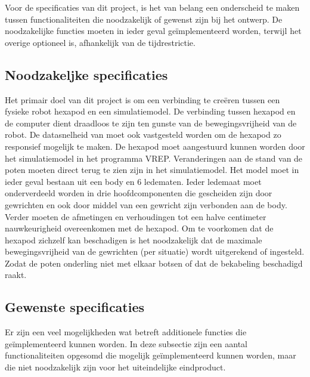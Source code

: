 \documentclass[10pt,a4paper]{article}
\begin{document}
Voor de specificaties van dit project, is het van belang een onderscheid te maken tussen functionaliteiten die noodzakelijk of gewenst zijn bij het ontwerp. De noodzakelijke functies moeten in ieder geval ge\"implementeerd worden, terwijl het overige optioneel is, afhankelijk van de tijdrestrictie.

\subsection{Noodzakeljke specificaties}
Het primair doel van dit project is om een verbinding te cre\"eren tussen een fysieke robot hexapod en een simulatiemodel. De verbinding tussen hexapod en de computer dient draadloos te zijn ten gunste van de bewegingsvrijheid van de robot. De datasnelheid van moet ook vastgesteld worden om de hexapod zo responsief mogelijk te maken. De hexapod moet aangestuurd kunnen worden door het simulatiemodel in het programma VREP. Veranderingen aan de stand van de poten moeten direct terug te zien zijn in het simulatiemodel. Het model moet in ieder geval bestaan uit een body en 6 ledematen. Ieder ledemaat moet onderverdeeld worden in drie hoofdcomponenten die gescheiden zijn door gewrichten en ook door middel van een gewricht zijn verbonden aan de body. Verder moeten de afmetingen en verhoudingen tot een halve centimeter nauwkeurigheid overeenkomen met de hexapod.
Om te voorkomen dat de hexapod zichzelf kan beschadigen is het noodzakelijk dat de maximale bewegingsvrijheid van de gewrichten (per situatie) wordt uitgerekend of ingesteld. Zodat de poten onderling niet met elkaar botsen of dat de bekabeling beschadigd raakt.

\subsection{Gewenste specificaties}
Er zijn een veel mogelijkheden wat betreft additionele functies die ge\"implementeerd kunnen worden. In deze subsectie zijn een aantal functionaliteiten opgesomd die mogelijk ge\"implementeerd kunnen worden, maar die niet noodzakelijk zijn voor het uiteindelijke eindproduct.
\end{document}
